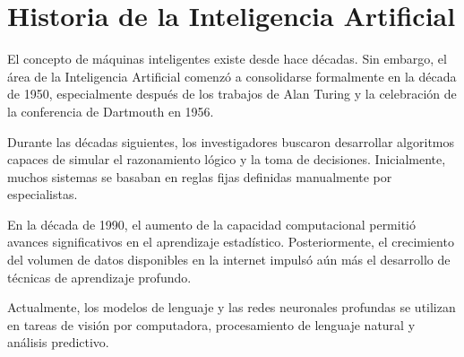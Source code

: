 \section{Historia de la Inteligencia Artificial}

El concepto de máquinas inteligentes existe desde hace décadas. Sin embargo, el área de la Inteligencia
Artificial comenzó a consolidarse formalmente en la década de 1950, especialmente después de los
trabajos de Alan Turing y la celebración de la conferencia de Dartmouth en 1956.

Durante las décadas siguientes, los investigadores buscaron desarrollar algoritmos capaces de
simular el razonamiento lógico y la toma de decisiones. Inicialmente, muchos sistemas se basaban en
reglas fijas definidas manualmente por especialistas.

En la década de 1990, el aumento de la capacidad computacional permitió avances significativos en el
aprendizaje estadístico. Posteriormente, el crecimiento del volumen de datos disponibles en la
internet impulsó aún más el desarrollo de técnicas de aprendizaje profundo.

Actualmente, los modelos de lenguaje y las redes neuronales profundas se utilizan en tareas de visión
por computadora, procesamiento de lenguaje natural y análisis predictivo.
 